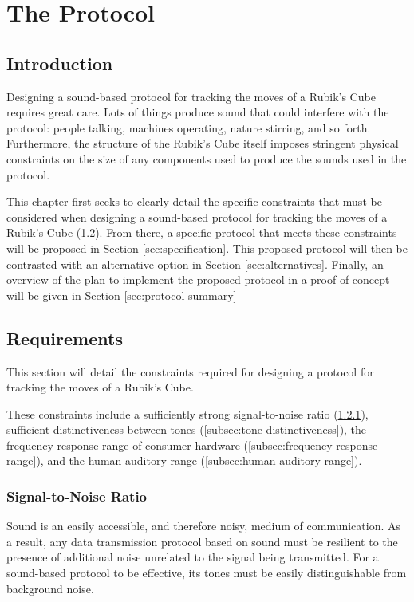 \chapter{The Protocol} %

\label{Chapter4} %


\section{Introduction}
Designing a sound-based protocol for tracking the moves of a Rubik's Cube requires great care.
Lots of things produce sound that could interfere with the protocol: people talking, machines operating, nature stirring, and so forth.
Furthermore, the structure of the Rubik's Cube itself imposes stringent physical constraints on the size of any components used to produce the sounds used in the protocol.

This chapter first seeks to clearly detail the specific constraints that must be considered when designing a sound-based protocol for tracking the moves of a Rubik's Cube (\ref{sec:protocol-requirements}).
From there, a specific protocol that meets these constraints will be proposed in Section \ref{sec:specification}.
This proposed protocol will then be contrasted with an alternative option in Section \ref{sec:alternatives}.
Finally, an overview of the plan to implement the proposed protocol in a proof-of-concept will be given in Section \ref{sec:protocol-summary}


\section{Requirements}
\label{sec:protocol-requirements}
This section will detail the constraints required for designing a protocol for tracking the moves of a Rubik's Cube.

These constraints include a sufficiently strong signal-to-noise ratio (\ref{subsec:signal-to-noise-ratio}), sufficient distinctiveness between tones (\ref{subsec:tone-distinctiveness}), the frequency response range of consumer hardware (\ref{subsec:frequency-response-range}), and the human auditory range (\ref{subsec:human-auditory-range}).

\subsection{Signal-to-Noise Ratio}
\label{subsec:signal-to-noise-ratio}
Sound is an easily accessible, and therefore noisy, medium of communication.
As a result, any data transmission protocol based on sound must be resilient to the presence of additional noise unrelated to the signal being transmitted.
For a sound-based protocol to be effective, its tones must be easily distinguishable from background noise.

